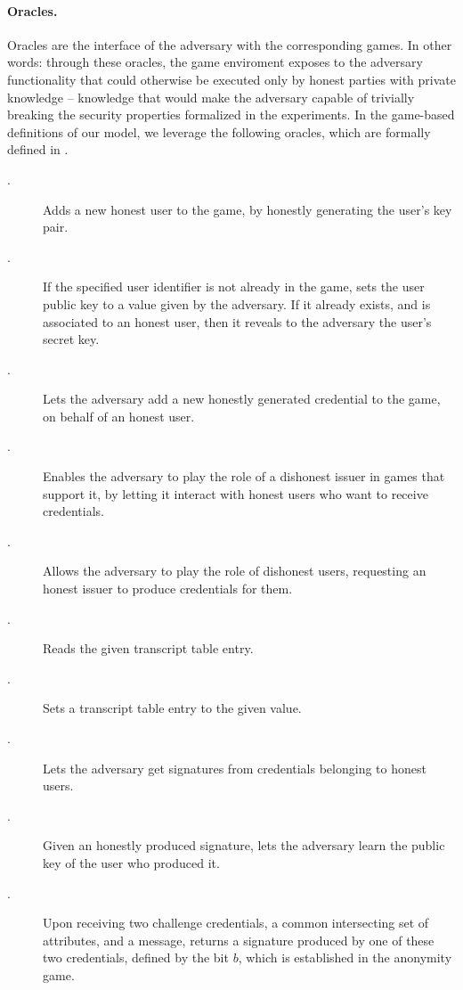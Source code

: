 \paragraph{Oracles.} %
Oracles are the interface of the adversary with the corresponding games. In
other words: through these oracles, the game enviroment exposes to the adversary
functionality that could otherwise be executed only by honest parties with
private knowledge -- knowledge that would make the adversary capable of
trivially breaking the security properties formalized in the experiments.
In the game-based definitions of our \GSAC model, we leverage the following
oracles, which are formally defined in .

\begin{description}
\item[\HUGEN.] Adds a new honest user to the game, by honestly generating
  the user's key pair.
\item[\CUGEN.] If the specified user identifier is not already in the game,
  sets the user public key to a value given by the adversary. If it already
  exists, and is associated to an honest user, then it reveals to the adversary
  the user's secret key.
\item[\OBTISS.] Lets the adversary add a new honestly generated credential to
  the game, on behalf of an honest user.
\item[\OBTAIN.] Enables the adversary to play the role of a dishonest issuer
  in games that support it, by letting it interact with honest users who want to
  receive credentials.
\item[\ISSUE.] Allows the adversary to play the role of dishonest users,
  requesting an honest issuer to produce credentials for them.
\item[\RREG.] Reads the given transcript table entry.
\item[\WREG.] Sets a transcript table entry to the given value.  
\item[\SIGN.] Lets the adversary get signatures from credentials belonging
  to honest users.
\item[\OPEN.] Given an honestly produced signature, lets the adversary learn
  the public key of the user who produced it.
\item[\CHALb.] Upon receiving two challenge credentials, a common intersecting
  set of attributes, and a message, returns a signature produced by one of these
  two credentials, defined by the bit $b$, which is established in the anonymity
  game.
\end{description}

